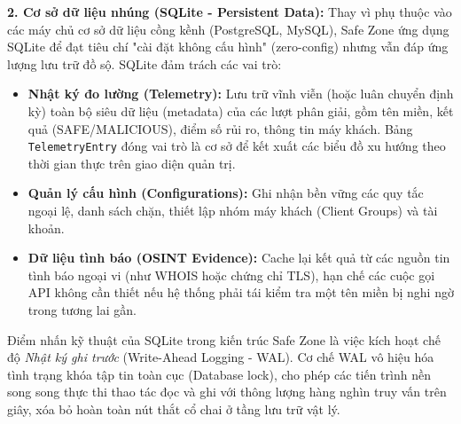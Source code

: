 \textbf{2. Cơ sở dữ liệu nhúng (SQLite - Persistent Data):}
Thay vì phụ thuộc vào các máy chủ cơ sở dữ liệu cồng kềnh (PostgreSQL, MySQL), Safe Zone ứng dụng SQLite để đạt tiêu chí "cài đặt không cấu hình" (zero-config) nhưng vẫn đáp ứng lượng lưu trữ đồ sộ. SQLite đảm trách các vai trò:
\begin{itemize}
    \item \textbf{Nhật ký đo lường (Telemetry):} Lưu trữ vĩnh viễn (hoặc luân chuyển định kỳ) toàn bộ siêu dữ liệu (metadata) của các lượt phân giải, gồm tên miền, kết quả (SAFE/MALICIOUS), điểm số rủi ro, thông tin máy khách. Bảng \texttt{TelemetryEntry} đóng vai trò là cơ sở để kết xuất các biểu đồ xu hướng theo thời gian thực trên giao diện quản trị.
    \item \textbf{Quản lý cấu hình (Configurations):} Ghi nhận bền vững các quy tắc ngoại lệ, danh sách chặn, thiết lập nhóm máy khách (Client Groups) và tài khoản.
    \item \textbf{Dữ liệu tình báo (OSINT Evidence):} Cache lại kết quả từ các nguồn tin tình báo ngoại vi (như WHOIS hoặc chứng chỉ TLS), hạn chế các cuộc gọi API không cần thiết nếu hệ thống phải tái kiểm tra một tên miền bị nghi ngờ trong tương lai gần.
\end{itemize}

Điểm nhấn kỹ thuật của SQLite trong kiến trúc Safe Zone là việc kích hoạt chế độ \textit{Nhật ký ghi trước} (Write-Ahead Logging - WAL). Cơ chế WAL vô hiệu hóa tình trạng khóa tập tin toàn cục (Database lock), cho phép các tiến trình nền song song thực thi thao tác đọc và ghi với thông lượng hàng nghìn truy vấn trên giây, xóa bỏ hoàn toàn nút thắt cổ chai ở tầng lưu trữ vật lý.
